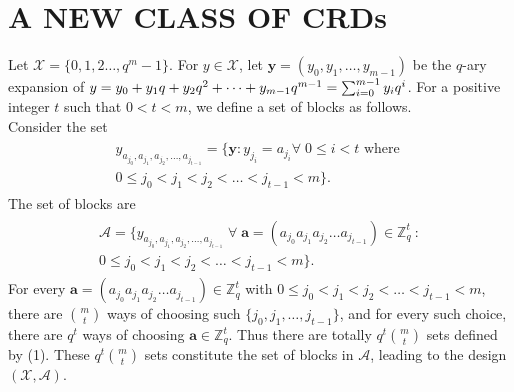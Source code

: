 \documentclass[conference]{IEEEtran}
\begin{document}
\section{A NEW CLASS OF CRDs}
	Let $\mathcal{X} = \{0, 1, 2 \dots, q^m - 1\}$. 
	For $y \in \mathcal{X}$, let $\textbf{y} = (y_0, y_1, \dots, y_{m-1}) $ be the $q$-ary expansion of $\boldmath{y} = y_0 + y_1 q + y_2 q^2 + \dots + y_{m-1} q^{m-1} = \sum_{i = 0}^{m-1}y_i q^i$. For a positive integer $t$ such that $0<t<m$, we define a set of blocks as follows.\\
	Consider the set 
	\begin{align}
	\begin{split}
	 y_{a_{j_0}, a_{j_1}, a_{j_2},\dots,a_{j_{t-1}}} = \{\textbf{y} : y_{j_i} = a_{j_i} \forall\; 0\leq i<t\text{ where } \\
	 0 \leq j_0<j_1<j_2< \dots <j_{t-1}<m\}.
	\end{split}
	\end{align} 
	The set of blocks are
	\begin{align*}
	\begin{split}
	\mathcal{A} = \{  y_{a_{j_0}, a_{j_1}, a_{j_2},\dots,a_{j_{t-1}}}\; \forall\; \textbf{a} = (a_{j_0} a_{j_1} a_{j_2} \dots a_{j_{t-1}}) \in \mathbb{Z}_q^t\ :\\ 0 \leq j_0<j_1<j_2< \dots <j_{t-1}<m \}.
	\end{split}
	\end{align*} 
For every $\textbf{a} = (a_{j_0} a_{j_1} a_{j_2} \dots a_{j_{t-1}}) \in \mathbb{Z}_q^t$ with $0 \leq j_0<j_1<j_2< \dots <j_{t-1}<m$, there are ${m}\choose{t}$ ways of choosing such $\{j_0, j_1,\dots, j_{t-1}\}$, and for every such choice, there are $q^t$ ways of choosing $\textbf{a} \in \mathbb{Z}_q^t$. Thus there are totally $q^t {{m}\choose{t}}$ sets defined by (1). These $q^t {{m}\choose{t}}$ sets constitute the set of blocks in $\mathcal{A}$, leading to the design $(\mathcal{X}, \mathcal{A})$.
\end{document}
